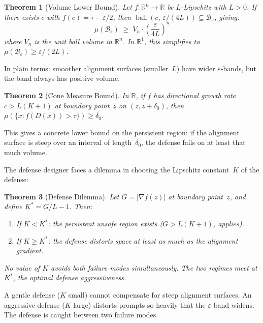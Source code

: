 \documentclass[11pt]{article}
\newtheorem{theorem}{Theorem}[section]
\newcommand{\R}{\mathbb{R}}
\begin{document}
\begin{theorem}[Volume Lower Bound]
\label{thm:coarea}
Let $f\colon \R^n \to \R$ be $L$-Lipschitz with $L > 0$. If there
exists $c$ with $f(c) = \tau - \varepsilon/2$, then
$\operatorname{ball}(c,\, \varepsilon/(4L)) \subseteq
\mathcal{B}_\varepsilon$, giving:
\begin{equation}
  \mu(\mathcal{B}_\varepsilon)
  \;\geq\; V_n \cdot \left(\frac{\varepsilon}{4L}\right)^{\!n}
\end{equation}
where $V_n$ is the unit ball volume in $\R^n$. In $\R^1$, this
simplifies to $\mu(\mathcal{B}_\varepsilon) \geq \varepsilon/(2L)$.
\end{theorem}

In plain terms: smoother alignment surfaces (smaller~$L$) have wider
$\varepsilon$-bands, but the band always has positive volume.

\begin{theorem}[Cone Measure Bound]
\label{thm:cone}
In $\R$, if $f$ has directional growth rate $c > L(K{+}1)$ at
boundary point~$z$ on $(z, z + \delta_0)$, then
$\mu(\{x : f(D(x)) > \tau\}) \geq \delta_0$.
\end{theorem}

This gives a concrete lower bound on the persistent region: if the
alignment surface is steep over an interval of length~$\delta_0$, the
defense fails on at least that much volume.

The defense designer faces a dilemma in choosing the Lipschitz
constant~$K$ of the defense:

\begin{theorem}[Defense Dilemma]
\label{thm:dilemma}
Let $G = |\nabla f(z)|$ at boundary point~$z$, and define
$K^* = G/L - 1$. Then:
\begin{enumerate}[nosep]
  \item If $K < K^*$: the persistent unsafe region exists
    ($G > L(K{+}1)$,  applies).
  \item If $K \geq K^*$: the defense distorts space at least as much
    as the alignment gradient.
\end{enumerate}
No value of $K$ avoids both failure modes simultaneously. The two
regimes meet at $K^*$, the optimal defense aggressiveness.
\end{theorem}

A gentle defense ($K$ small) cannot compensate for steep alignment
surfaces. An aggressive defense ($K$ large) distorts prompts so
heavily that the $\varepsilon$-band widens. The defense is caught
between two failure modes.
\end{document}
